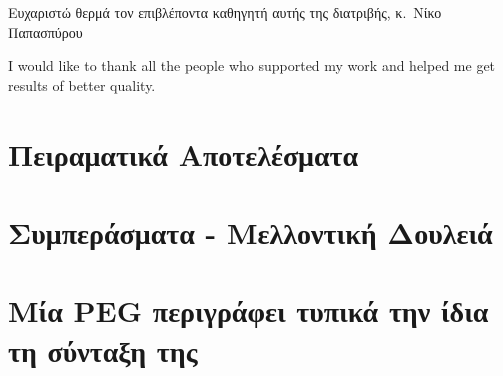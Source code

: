 \documentclass[diploma]{softlab-thesis}
\begin{document}

\begin{acknowledgementsgr}
  Ευχαριστώ θερμά τον επιβλέποντα καθηγητή αυτής της διατριβής,
  κ.~Νίκο Παπασπύρου
\end{acknowledgementsgr}

\begin{acknowledgementsen}
  I would like to thank all the people who supported my work and helped me get
  results of better quality.  
\end{acknowledgementsen}



\tableofcontents
\listoffigures


\mainmatter













\chapter{ Πειραματικά Αποτελέσματα }

\chapter{ Συμπεράσματα - Μελλοντική Δουλειά }



\nocite{*}






\backmatter

\appendix

\chapter{Μία PEG περιγράφει τυπικά την ίδια τη σύνταξη της}
\end{document}
